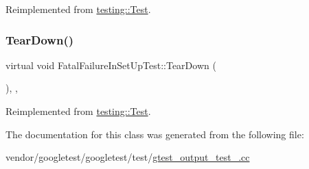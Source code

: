 Reimplemented from \hyperlink{classtesting_1_1_test_a190315150c303ddf801313fd1a777733}{testing\+::\+Test}.

\mbox{\label{class_fatal_failure_in_set_up_test_a457707161063e08f7b6600ec5db449e4}} 
\subsubsection{\texorpdfstring{Tear\+Down()}{TearDown()}}
{\footnotesize\ttfamily virtual void Fatal\+Failure\+In\+Set\+Up\+Test\+::\+Tear\+Down (\begin{DoxyParamCaption}{ }\end{DoxyParamCaption})\hspace{0.3cm}{\ttfamily [inline]}, {\ttfamily [protected]}, {\ttfamily [virtual]}}



Reimplemented from \hyperlink{classtesting_1_1_test_a5f0ab439802cbe0ef7552f1a9f791923}{testing\+::\+Test}.



The documentation for this class was generated from the following file\+:\begin{DoxyCompactItemize}
\item 
vendor/googletest/googletest/test/\hyperlink{gtest__output__test___8cc}{gtest\+\_\+output\+\_\+test\+\_\+.\+cc}\end{DoxyCompactItemize}
